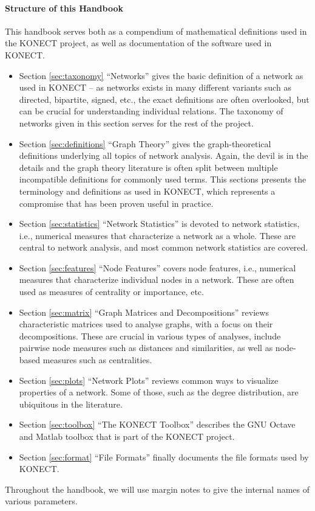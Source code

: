 \documentclass{article}
\begin{document}
\paragraph{Structure of this Handbook}
This handbook serves both as a compendium of mathematical definitions
used in the KONECT project, as well as documentation of the software
used in KONECT. 
\begin{itemize}
\item Section \ref{sec:taxonomy} ``Networks'' gives the basic
  definition of a network as used in KONECT -- as networks exists in
  many different variants such as directed, bipartite, signed, etc., the
  exact definitions are often overlooked, but can be crucial for
  understanding individual relations. The taxonomy of networks given in
  this section serves for the rest of the project. 
\item Section \ref{sec:definitions} ``Graph Theory'' gives the
  graph-theoretical definitions underlying all topics of network analysis.  Again,
  the devil is in the details and the graph theory literature is often
  split between multiple incompatible definitions for commonly used
  terms.  This sections presents the terminology and definitions as used
  in KONECT, which represents a compromise that has been proven useful
  in practice. 
\item Section \ref{sec:statistics} ``Network Statistics'' is devoted to
  network statistics, i.e., numerical measures that characterize a
  network as a whole.  These are central to network analysis, and most
  common network statistics are covered. 
\item Section \ref{sec:features} ``Node Features'' covers node features,
  i.e., numerical measures that characterize individual nodes in a
  network.  These are often used as measures of centrality or
  importance, etc. 
\item Section \ref{sec:matrix} ``Graph Matrices and Decompositions'' reviews
  characteristic matrices used to analyse graphs, with a focus on their
  decompositions.  These are crucial in various types of analyses,
  include pairwise node measures such as distances and similarities, as
  well as node-based measures such as centralities. 
\item Section \ref{sec:plots} ``Network Plots'' reviews common ways to
  visualize properties of a network.  Some of those, such as the degree
  distribution, are ubiquitous in the literature. 
\item Section \ref{sec:toolbox} ``The KONECT Toolbox'' describes the GNU
  Octave and Matlab toolbox that is part of the KONECT project. 
\item Section \ref{sec:format} ``File Formats'' finally documents the
  file formats used by KONECT. 
\end{itemize}
Throughout the handbook, we will use margin notes to give the internal
names of various parameters. 
\end{document}
